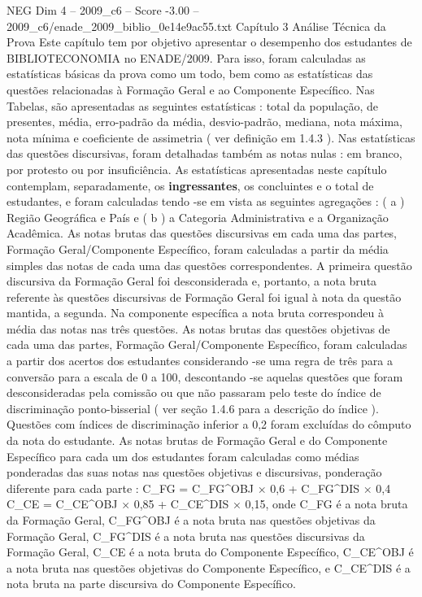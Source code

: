 \begin{textsample}{NEG Dim 4 – 2009\_c6 – Score -3.00 – 2009\_c6/enade\_2009\_biblio\_0e14e9ac55.txt}  \label{ex:f4_neg_031}
Capítulo 3 Análise Técnica da Prova Este capítulo tem por objetivo apresentar o desempenho dos estudantes de BIBLIOTECONOMIA no ENADE/2009.
Para isso, foram calculadas as estatísticas básicas da prova como um todo, bem como as estatísticas das questões relacionadas à Formação Geral e ao Componente Específico.
Nas Tabelas, são apresentadas as seguintes estatísticas : total da população, de presentes, média, erro-padrão da média, desvio-padrão, mediana, nota máxima, nota mínima e coeficiente de assimetria ( ver definição em 1.4.3 ).
Nas estatísticas das questões discursivas, foram detalhadas também as notas nulas : em branco, por protesto ou por insuficiência.
As estatísticas apresentadas neste capítulo contemplam, separadamente, os \textbf{ingressantes}, os concluintes e o total de estudantes, e foram calculadas tendo -se em vista as seguintes agregações : ( a ) Região Geográfica e País e ( b ) a Categoria Administrativa e a Organização Acadêmica.
As notas brutas das questões discursivas em cada uma das partes, Formação Geral/Componente Específico, foram calculadas a partir da média simples das notas de cada uma das questões correspondentes.
A primeira questão discursiva da Formação Geral foi desconsiderada e, portanto, a nota bruta referente às questões discursivas de Formação Geral foi igual à nota da questão mantida, a segunda.
Na componente específica a nota bruta correspondeu à média das notas nas três questões.
As notas brutas das questões objetivas de cada uma das partes, Formação Geral/Componente Específico, foram calculadas a partir dos acertos dos estudantes considerando -se uma regra de três para a conversão para a escala de 0 a 100, descontando -se aquelas questões que foram desconsideradas pela comissão ou que não passaram pelo teste do índice de discriminação ponto-bisserial ( ver seção 1.4.6 para a descrição do índice ).
Questões com índices de discriminação inferior a 0,2 foram excluídas do cômputo da nota do estudante.
As notas brutas de Formação Geral e do Componente Específico para cada um dos estudantes foram calculadas como médias ponderadas das suas notas nas questões objetivas e discursivas, ponderação diferente para cada parte : C\_FG = C\_FG\textasciicircum{}OBJ × 0,6 + C\_FG\textasciicircum{}DIS × 0,4 C\_CE = C\_CE\textasciicircum{}OBJ × 0,85 + C\_CE\textasciicircum{}DIS × 0,15, onde C\_FG é a nota bruta da Formação Geral, C\_FG\textasciicircum{}OBJ é a nota bruta nas questões objetivas da Formação Geral, C\_FG\textasciicircum{}DIS é a nota bruta nas questões discursivas da Formação Geral, C\_CE é a nota bruta do Componente Específico, C\_CE\textasciicircum{}OBJ é a nota bruta nas questões objetivas do Componente Específico, e C\_CE\textasciicircum{}DIS é a nota bruta na parte discursiva do Componente Específico.

\end{textsample}
